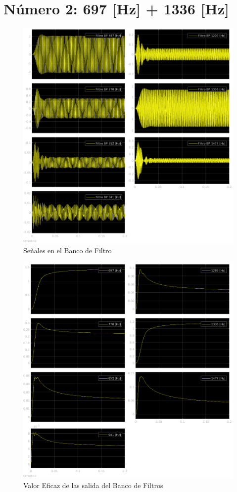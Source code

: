 \section{Número 2: 697 [Hz] + 1336 [Hz]}
\label{sec:signal_2}
\begin{figure}[H]
  \centering
  \includegraphics[width=\linewidth]{images/simulacion/fallas/bank/2.png}
  \caption{Señales en el Banco de Filtro}
  \label{fig:num_2_bank}
\end{figure}

\begin{figure}[H]
  \centering
  \includegraphics[width=\linewidth]{images/simulacion/fallas/rms/2.png}
  \caption{Valor Eficaz de las salida del Banco de Filtros }
  \label{fig:num_2_rms}
\end{figure}

